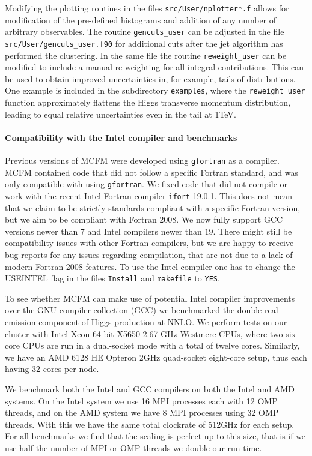 Modifying the plotting routines in the files \texttt{src/User/nplotter*.f} allows for modification of the pre-defined 
histograms and addition of any number of arbitrary observables. The routine \texttt{gencuts\_user} can be adjusted  in 
the file
\texttt{src/User/gencuts\_user.f90} for additional cuts after the jet algorithm has performed the 
clustering. In the same file the routine \texttt{reweight\_user} can be modified to include a manual re-weighting
for all integral contributions. This can be used to obtain improved uncertainties in, for example, tails of 
distributions.
One example is included in the subdirectory \texttt{examples}, where the \texttt{reweight\_user} function approximately
flattens the Higgs transverse momentum distribution, leading to equal relative uncertainties even in the tail at 
{1}{TeV}.


\paragraph{Compatibility with the Intel compiler and benchmarks}

Previous versions of MCFM were developed using \texttt{gfortran} as a compiler. MCFM contained code that did not 
follow 
a specific Fortran standard, and was only compatible with using \texttt{gfortran}. We fixed code that did not compile 
or work with the recent Intel Fortran compiler \texttt{ifort} 19.0.1. This does not mean that we claim to be strictly 
standards 
compliant with a specific Fortran version, but we aim to be compliant with Fortran 2008. We now fully support GCC 
versions newer than $7$ and Intel compilers newer than $19$. There might still be compatibility issues with other 
Fortran compilers, but we are happy to receive bug reports for any issues regarding compilation, that are not due to a 
lack of modern Fortran 2008 features. To use the Intel compiler one has to change the USEINTEL flag in the files 
\texttt{Install} and \texttt{makefile}
to \texttt{YES}.

To see whether MCFM can make use of potential Intel compiler improvements over the GNU compiler 
collection (GCC) we benchmarked 
the double
real emission component of Higgs production at NNLO. We perform tests on our cluster with
Intel Xeon 64-bit X5650 2.67 GHz Westmere CPUs, where two six-core CPUs are run in a dual-socket mode with a total
of twelve cores. Similarly, we have an AMD 6128 HE Opteron 2GHz quad-socket eight-core setup, thus each having
32 cores per node.

We benchmark both the Intel and GCC compilers on both the Intel and AMD systems. On the Intel system we use 16 MPI 
processes each with 12 OMP threads, 
and on the AMD system we have 8 MPI processes using 32 OMP threads. With this we have the same total
clockrate of {512}{GHz} for each setup. For all benchmarks we find that the scaling is perfect up to this size, that 
is if we use half the number of MPI or OMP threads we double our run-time.

